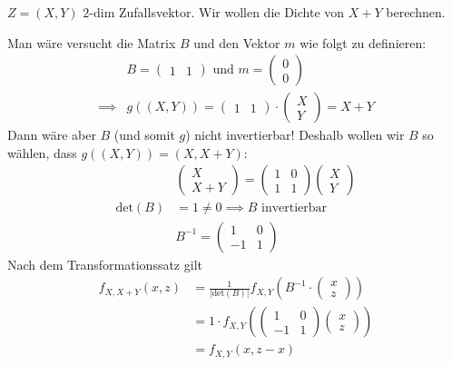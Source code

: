 $Z = (X, Y)$ $2$-dim Zufallsvektor. Wir wollen die Dichte von $X + Y$ berechnen.

Man wäre versucht die Matrix $B$ und den Vektor $m$ wie folgt zu definieren:
\begin{align*}
    &B= 
    \left(\begin{matrix}
        1 & 1
    \end{matrix}\right) 
    \text{ und } 
    m = \left(\begin{matrix}
        0\\
        0
    \end{matrix}\right)\\
    \implies &g((X,Y)) = 
    \left(\begin{matrix}
        1 & 1
    \end{matrix}\right) \cdot 
    \left(\begin{matrix}
        X\\
        Y
    \end{matrix}\right) = X + Y
\end{align*}
Dann wäre aber $B$ (und somit $g$) nicht invertierbar!
Deshalb wollen wir $B$ so wählen, dass $g((X,Y)) = (X, X + Y)$:
\begin{align*}
    &\left(\begin{matrix}
        X\\
        X + Y
    \end{matrix}\right) 
    = \left(\begin{matrix}
        1 & 0\\
        1 & 1
    \end{matrix}\right)
    \left(\begin{matrix}
        X\\
        Y
    \end{matrix}\right)\\
    \text{det}(B)&= 1 \neq 0 \implies B \text{ invertierbar}\\
    &B^{-1} = \left(\begin{matrix}
        1 & 0\\
        -1 & 1
    \end{matrix}\right)
\end{align*}
Nach dem Transformationssatz gilt
\begin{align*}
    f_{X, X+Y}(x, z) &= \frac{1}{|\text{det}(B)|}f_{X, Y}\left(B^{-1}\cdot 
    \left(\begin{matrix}
        x\\
        z
    \end{matrix}\right)\right)\\
    &= 1 \cdot f_{X, Y}\left(\left(\begin{matrix}
        1 & 0\\
        -1 & 1
    \end{matrix}\right)\left(\begin{matrix}
        x\\
        z
    \end{matrix}\right)\right)\\
    &= f_{X, Y}\left(x, z-x\right)
\end{align*}
